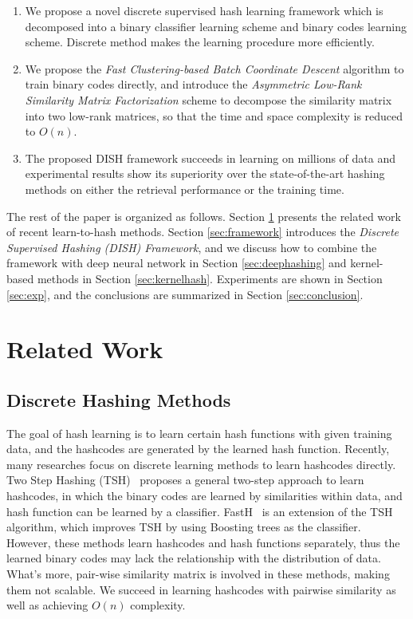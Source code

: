 \documentclass[conference]{IEEEtran}
\begin{document}
\begin{enumerate}
    \item We propose a novel discrete supervised hash learning framework which is decomposed into a binary classifier learning scheme and binary codes learning scheme. Discrete method makes the learning procedure more efficiently.
    \item We propose the {\em Fast Clustering-based Batch Coordinate Descent} algorithm to train binary codes directly, and introduce the {\em Asymmetric Low-Rank Similarity Matrix Factorization} scheme to decompose the similarity matrix into two low-rank matrices, so that the time and space complexity is reduced to $O(n)$.
    \item The proposed DISH framework succeeds in learning on millions of data and experimental results show its superiority over the state-of-the-art hashing methods on either the retrieval performance or the training time.
\end{enumerate}

The rest of the paper is organized as follows. Section \ref{sec:related} presents the related work of recent learn-to-hash methods. Section \ref{sec:framework} introduces the {\em Discrete Supervised Hashing (DISH) Framework}, and we discuss how to combine the framework with deep neural network in Section \ref{sec:deephashing} and kernel-based methods in Section \ref{sec:kernelhash}. Experiments are shown in Section \ref{sec:exp}, and the conclusions are summarized in Section \ref{sec:conclusion}.

\section{Related Work}
\label{sec:related}
\subsection{Discrete Hashing Methods}

The goal of hash learning is to learn certain hash functions with given training data, and the hashcodes are generated by the learned hash function. Recently, many researches focus on discrete learning methods to learn hashcodes directly. Two Step Hashing (TSH)~\cite{lin2013general} proposes a general two-step approach to learn hashcodes, in which the binary codes are learned by similarities within data, and hash function can be learned by a classifier. FastH~\cite{lin2014fast} is an extension of the TSH algorithm, which improves TSH by using Boosting trees as the classifier. However, these methods learn hashcodes and hash functions separately, thus the learned binary codes may lack the relationship with the distribution of data. What's more, pair-wise similarity matrix is involved in these methods, making them not scalable. We succeed in learning hashcodes with pairwise similarity as well as achieving $O(n)$ complexity.
\end{document}
